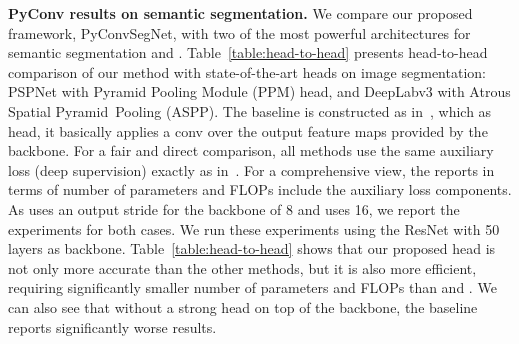 \documentclass{article}
\begin{document}
{\bf PyConv results on semantic segmentation.} We compare our proposed framework, PyConvSegNet, with two of the most powerful  architectures for semantic segmentation \cite{zhao2017pyramid} and \cite{chen2017rethinking}.
Table~\ref{table:head-to-head} presents head-to-head comparison of our method with state-of-the-art heads on image segmentation: PSPNet with Pyramid Pooling Module (PPM) head, and DeepLabv3 with Atrous Spatial Pyramid~Pooling (ASPP).  The baseline is constructed as in~\cite{zhao2017pyramid}, which as head, it basically applies a  conv over the output feature maps provided by the backbone.
For a fair and direct comparison, all methods use the same auxiliary loss (deep supervision) exactly as in~\cite{zhao2017pyramid}. For a comprehensive view, the reports in terms of number of parameters and FLOPs include the auxiliary loss components. As \cite{zhao2017pyramid} uses an output stride for the backbone of 8 and  \cite{chen2017rethinking} uses 16, we report the experiments for both cases. We run these experiments using the ResNet with 50 layers as backbone. Table~\ref{table:head-to-head} shows that our proposed head is not only more accurate than the other methods, but it is also more efficient, requiring significantly smaller number of parameters and FLOPs than  \cite{zhao2017pyramid} and \cite{chen2017rethinking}. We can also see that without a strong head on top of the backbone, the baseline reports significantly worse results. 
\end{document}
